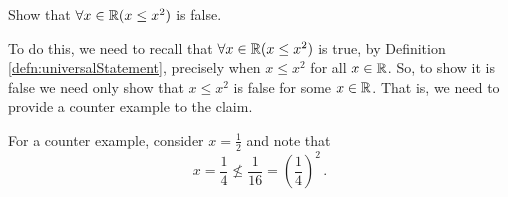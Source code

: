 \guard



\begin{exmp}
\label{exmp:univeralStatementOverRealsFalse}
	Show that $\forall x\in \mathbb{R}(x \leq x^2)$ is false.

	To do this, we need to recall that $\forall x\in \mathbb{R}(x \leq x^2)$ is true, by Definition \ref{defn:universalStatement}, precisely when $x\leq x^2$ for all $x\in \mathbb{R}$.
	So, to show it is false we need only show that $x \leq x^2$ is false for some $x\in\mathbb{R}$.
	That is, we need to provide a counter example to the claim.

	For a counter example, consider $x=\frac{1}{2}$ and note that \[ x=\frac{1}{4}\not\leq \frac{1}{16} = \left(\frac{1}{4}\right)^2\,.\]
\end{exmp}
